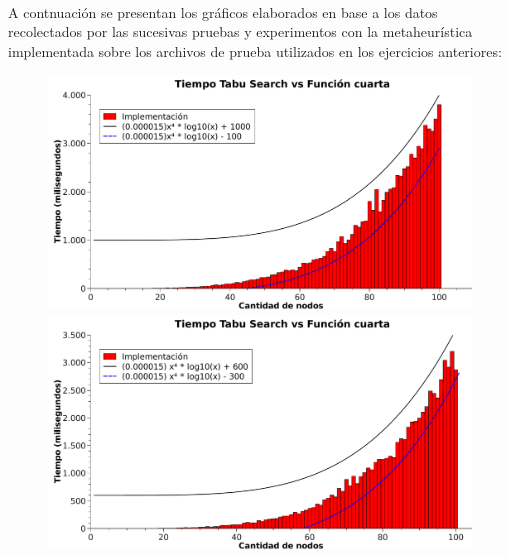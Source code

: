 \paragraph{}
A contnuación se presentan los gráficos elaborados en base a los datos recolectados por las sucesivas pruebas y experimentos con la metaheurística implementada sobre los archivos de prueba utilizados en los ejercicios anteriores: \\

\begin{figure}[htb]
\begin{minipage}{\textwidth}
\begin{center}
	\includegraphics[width=\textwidth]{./otros/graficos/tiempo_100nodos1_ej5.pdf}
	\caption{}
	\label{ej5tiempo1}
\end{center}
\end{minipage}

\begin{minipage}{\textwidth}
\begin{center}
	\includegraphics[width=\textwidth]{./otros/graficos/tiempo_100nodos2_ej5.pdf}
	\caption{}
	\label{ej5tiempo2}
\end{center}
\end{minipage}
\end{figure}

